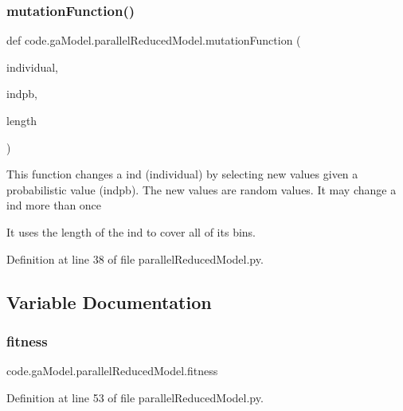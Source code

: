 \subsubsection{\texorpdfstring{mutation\+Function()}{mutationFunction()}}
{\footnotesize\ttfamily def code.\+ga\+Model.\+parallel\+Reduced\+Model.\+mutation\+Function (\begin{DoxyParamCaption}\item[{}]{individual,  }\item[{}]{indpb,  }\item[{}]{length }\end{DoxyParamCaption})}

\begin{DoxyVerb}This function changes a ind (individual) by selecting new values given a probabilistic value (indpb).
The new values are random values. It may change a ind more than once

It uses the length of the ind to cover all of its bins.
\end{DoxyVerb}
 

Definition at line 38 of file parallel\+Reduced\+Model.\+py.



\subsection{Variable Documentation}
\mbox{\label{namespacecode_1_1ga_model_1_1parallel_reduced_model_a173904077397c736050b361163656cb1}} 
\subsubsection{\texorpdfstring{fitness}{fitness}}
{\footnotesize\ttfamily code.\+ga\+Model.\+parallel\+Reduced\+Model.\+fitness}



Definition at line 53 of file parallel\+Reduced\+Model.\+py.

\mbox{\label{namespacecode_1_1ga_model_1_1parallel_reduced_model_a83a1e905cdec62ce256ac99f2c629ec0}} 
